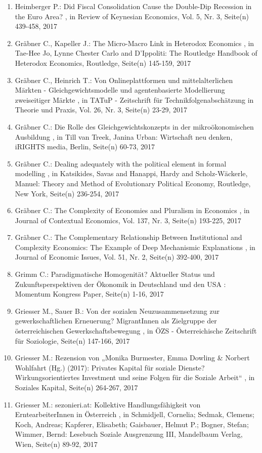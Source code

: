 \begin{enumerate}[leftmargin=*, labelsep=0.5cm]
	 \item Heimberger P.:  Did Fiscal Consolidation Cause the Double-Dip Recession in the Euro Area?  , in Review of Keynesian Economics, Vol. 5, Nr. 3, Seite(n) 439-458, 2017
	 \item Gräbner C., Kapeller J.:  The Micro-Macro Link in Heterodox Economics  , in Tae-Hee Jo, Lynne Chester Carlo and D'Ippoliti: The Routledge Handbook of Heterodox Economics, Routledge, Seite(n) 145-159, 2017
	 \item Gräbner C., Heinrich T.:  Von Onlineplattformen und mittelalterlichen Märkten - Gleichgewichtsmodelle und agentenbasierte Modellierung zweiseitiger Märkte  , in TATuP - Zeitschrift für Technikfolgenabschätzung in Theorie und Praxis, Vol. 26, Nr. 3, Seite(n) 23-29, 2017
	 \item Gräbner C.:  Die Rolle des Gleichgewichtskonzepts in der mikroökonomischen Ausbildung  , in Till van Treek, Janina Urban: Wirtschaft neu denken, iRIGHTS media, Berlin, Seite(n) 60-73, 2017
	 \item Gräbner C.:  Dealing adequately with the political element in formal modelling  , in Katsikides, Savas and Hanappi, Hardy and Scholz-Wäckerle, Manuel: Theory and Method of Evolutionary Political Economy, Routledge, New York, Seite(n) 236-254, 2017
	 \item Gräbner C.:  The Complexity of Economies and Pluralism in Economics  , in Journal of Contextual Economics, Vol. 137, Nr. 3, Seite(n) 193-225, 2017
	 \item Gräbner C.:  The Complementary Relationship Between Institutional and Complexity Economics: The Example of Deep Mechanismic Explanations  , in Journal of Economic Issues, Vol. 51, Nr. 2, Seite(n) 392-400, 2017
	 \item Grimm C.:  Paradigmatische Homogenität? Aktueller Status und Zukunftsperspektiven der Ökonomik in Deutschland und den USA  : Momentum Kongress Paper, Seite(n) 1-16, 2017
	 \item Griesser M., Sauer B.:  Von der sozialen Neuzusammensetzung zur gewerkschaftlichen Erneuerung? MigrantInnen als Zielgruppe der österreichischen Gewerkschaftsbewegung  , in ÖZS - Österreichische Zeitschrift für Soziologie, Seite(n) 147-166, 2017
	 \item Griesser M.:  Rezension von „Monika Burmester, Emma Dowling & Norbert Wohlfahrt (Hg.) (2017): Privates Kapital für soziale Dienste? Wirkungsorientiertes Investment und seine Folgen für die Soziale Arbeit“  , in Soziales Kapital, Seite(n) 264-267, 2017
	 \item Griesser M.:  sezonieri.at: Kollektive Handlungsfähigkeit von ErntearbeiterInnen in Österreich  , in Schmidjell, Cornelia; Sedmak, Clemens; Koch, Andreas; Kapferer, Elisabeth; Gaisbauer, Helmut P.; Bogner, Stefan; Wimmer, Bernd: Lesebuch Soziale Ausgrenzung III, Mandelbaum Verlag, Wien, Seite(n) 89-92, 2017

\end{enumerate}
